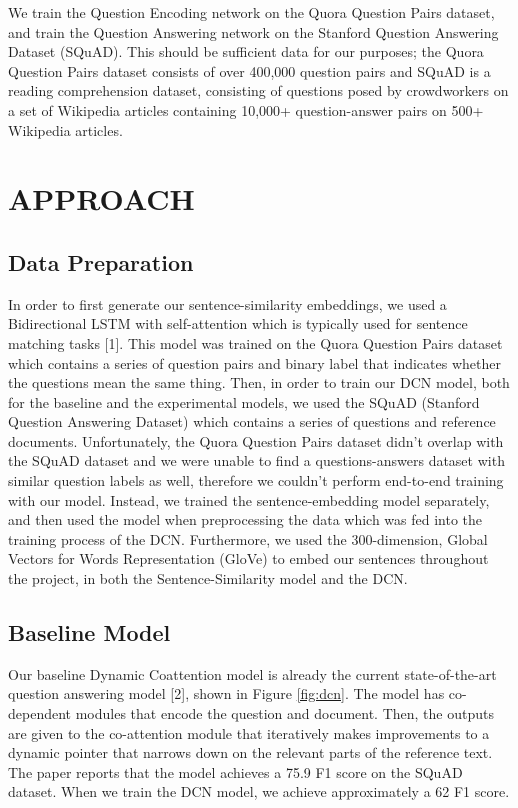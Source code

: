 \documentclass[a4paper, 11pt]{article}
\begin{document}
We train the Question Encoding network on the Quora Question Pairs dataset, and train the Question Answering network on the Stanford Question Answering Dataset (SQuAD). This should be sufficient data for our purposes; the Quora Question Pairs dataset consists of over 400,000 question pairs and SQuAD is a reading comprehension dataset, consisting of questions posed by crowdworkers on a set of Wikipedia articles containing 10,000+ question-answer pairs on 500+ Wikipedia articles. \newline\newline

\section{APPROACH} 
\subsection{Data Preparation}
In order to first generate our sentence-similarity embeddings, we used a Bidirectional LSTM with self-attention which is typically used for sentence matching tasks [1]. This model was trained on the Quora Question Pairs dataset which contains a series of question pairs and binary label that indicates whether the questions mean the same thing. Then, in order to train our DCN model, both for the baseline and the experimental models, we used the SQuAD (Stanford Question Answering Dataset) which contains a series of questions and reference documents. \newline\newline
Unfortunately, the Quora Question Pairs dataset didn't overlap with the SQuAD dataset and we were unable to find a questions-answers dataset with similar question labels as well, therefore we couldn't perform end-to-end training with our model. Instead, we trained the sentence-embedding model separately, and then used the model when preprocessing the data which was fed into the training process of the DCN.\newline\newline
Furthermore, we used the 300-dimension, Global Vectors for Words Representation (GloVe) to embed our sentences throughout the project, in both the Sentence-Similarity model and the DCN. 

\subsection{Baseline Model}
Our baseline Dynamic Coattention model is already the current state-of-the-art question answering model [2], shown in Figure \ref{fig:dcn}. The model has co-dependent modules that encode the question and document. Then, the outputs are given to the co-attention module that iteratively makes improvements to a dynamic pointer that narrows down on the relevant parts of the reference text. The paper reports that the model achieves a 75.9 F1 score on the SQuAD dataset.  When we train the DCN model, we achieve approximately a 62 F1 score.  
\end{document}
